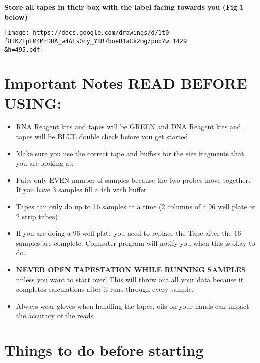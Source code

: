 \documentclass[
  letterpaper,
  DIV=11,
  numbers=noendperiod]{scrreprt}
\begin{document}
\textbf{Store all tapes in their box with the label facing towards you
(Fig 1 below)}

\texttt{[image: https://docs.google.com/drawings/d/1t0-f8TKZFptM4MrDHA\_w4AtsOcy\_YRR7boeD1aCk2mg/pub?w=1429\\\&h=495.pdf]}

\hypertarget{important-notes-read-before-using}{%
\section*{\texorpdfstring{\textbf{Important Notes READ BEFORE
USING:}}{Important Notes READ BEFORE USING:}}\label{important-notes-read-before-using}}


\begin{itemize}
\item
  RNA Reagent kits and tapes will be GREEN and DNA Reagent kits and
  tapes will be BLUE double check before you get started
\item
  Make sure you use the correct tape and buffers for the size fragments
  that you are looking at:
\item
  Pairs only EVEN number of samples because the two probes move
  together. If you have 3 samples fill a 4th with buffer
\item
  Tapes can only do up to 16 samples at a time (2 columns of a 96 well
  plate or 2 strip tubes)
\item
  If you are doing a 96 well plate you need to replace the Tape after
  the 16 samples are complete. Computer program will notify you when
  this is okay to do.
\item
  \textbf{NEVER OPEN TAPESTATION WHILE RUNNING SAMPLES} unless you want
  to start over! This will throw out all your data because it completes
  calculations after it runs through every sample.
\item
  Always wear gloves when handling the tapes, oils on your hands can
  impact the accuracy of the reads
\end{itemize}

\hypertarget{things-to-do-before-starting}{%
\section*{\texorpdfstring{\textbf{Things to do before
starting}}{Things to do before starting}}\label{things-to-do-before-starting}}
\end{document}
